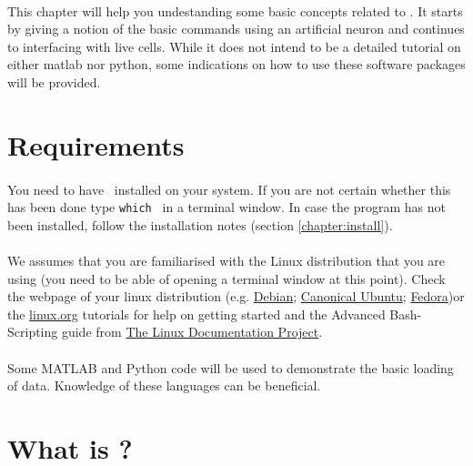 \paragraph{}
This chapter will help you undestanding some basic concepts related to \progname. It starts by giving a notion of the basic commands using an artificial neuron and continues to interfacing with live cells. While it does not intend to be a detailed tutorial on either matlab nor python, some indications on how to use these software packages will be provided.

\section{Requirements}
\paragraph{}
You need to have \progname\ installed on your system. If you are not certain whether this has been done type \texttt{which \progname} in a terminal window. In case the program has not been installed, follow the installation notes (section \ref{chapter:install}).

\paragraph{}
We assumes that you are familiarised with the Linux distribution that you are using (you need to be able of opening a terminal window at this point). Check the webpage of your linux distribution (e.g. \href{http://www.debian.org}{Debian}; \href{http://www.ubuntu.com}{Canonical Ubuntu}; \href{http://www.fedoraproject.org}{Fedora})or the \href{http://www.linux.org/tutorial}{linux.org} tutorials for help on getting started and the Advanced Bash-Scripting guide from \href{http://www.tldp.org}{The Linux Documentation Project}.

\paragraph{}
Some MATLAB and Python code will be used to demonstrate the basic loading of data. Knowledge of these languages can be beneficial.

\paragraph{}

\section{What is \progname?}

